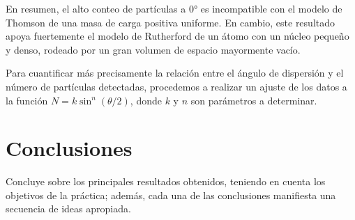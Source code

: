 \documentclass[twocolumn,a4paper,11pt]{scrartcl}
\begin{document}
En resumen, el alto conteo de partículas a 0° es incompatible con el modelo de Thomson de una masa de carga positiva uniforme. En cambio, este resultado apoya fuertemente el modelo de Rutherford de un átomo con un núcleo pequeño y denso, rodeado por un gran volumen de espacio mayormente vacío.

Para cuantificar más precisamente la relación entre el ángulo de dispersión y el número de partículas detectadas, procedemos a realizar un ajuste de los datos a la función $N = k \sin^n (\theta/2)$, donde $k$ y $n$ son parámetros a determinar.


\section{Conclusiones}
Concluye sobre los principales resultados obtenidos, teniendo en cuenta los objetivos de la práctica; además, cada una de las conclusiones manifiesta una secuencia de ideas apropiada.



\end{document}
